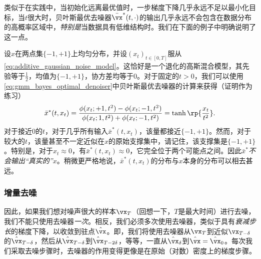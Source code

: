 \documentclass[../../book-main_zh.tex]{subfiles}
\begin{document}
类似于在实践中，当初始化远离最优值时，一步梯度下降几乎永远不足以最小化目标，当\(t\)很大时，贝叶斯最优去噪器\(\bar{\vx}^{\ast}(t, \cdot)\)的输出几乎永远不会包含在数据分布的高概率区域中，\textit{特别是}当数据具有低维结构时。我们在下面的例子中明确说明了这一点。
\begin{example}[两点混合的去噪]\label{example:denoising_twopoints}
    设\(x\)在两点集\(\{-1, +1\}\)上均匀分布，并设\((x_{t})_{t \in [0, T]}\)服从\eqref{eq:additive_gaussian_noise_model}。这恰好是一个退化的高斯混合模型，其先验等于\(\frac{1}{2}\)，均值为\(\{-1, +1\}\)，协方差均等于\(0\)。对于固定的\(t > 0\)，我们可以使用\eqref{eq:gmm_bayes_optimal_denoiser}中贝叶斯最优去噪器的计算来获得（证明作为练习）
    \begin{equation}
        \bar{x}^{\ast}(t, x_{t}) = \frac{\phi(x_{t} ; +1, t^{2}) - \phi(x_{t}
        ; -1, t^{2})}{\phi(x_{t} ; 1, t^{2}) + \phi(x_{t} ; -1,
        t^{2})} = \tanh\rp{\frac{x_{t}}{t^{2}}}.
    \end{equation}
    对于接近\(0\)的\(t\)，对于几乎所有输入\(\bar{x}^{\ast}(t, x_{t})\)，该量都接近\(\{-1, +1\}\)。然而，对于较大的\(t\)，该量甚至不一定近似在\(x\)的原始支撑集中，请记住，该支撑集是\(\{-1, +1\}\)。特别是，对于\(x_{t} \approx 0\)，有\(\bar{x}^{\ast}(t, x_{t}) \approx 0\)，它完全位于两个可能点之间。因此\(\bar{x}^{\ast}\)\textit{不会输出“真实的”\(x\)}。稍微更严格地说，\(\bar{x}^{\ast}(t, x_{t})\)的分布与\(x\)本身的分布可以相去甚远。
\end{example}

\subsubsection{增量去噪}
因此，如果我们想对噪声很大的样本\(\vx_{T}\)（回想一下，\(T\)是最大时间）进行去噪，我们不能只使用去噪器\textit{一次}。相反，我们必须多次使用去噪器，类似于具有\textit{衰减步长}的梯度下降，以收敛到驻点\(\hat{\vx}\)。即，我们将使用去噪器从\(\vx_{T}\)到近似\(\vx_{T - \delta}\)的\(\hat{\vx}_{T - \delta}\)，然后从\(\hat{\vx}_{T - \delta}\)到\(\hat{\vx}_{T - 2\delta}\)，等等，一直从\(\hat{\vx}_{\delta}\)到\(\hat{\vx} = \hat{\vx}_{0}\)。每次我们采取去噪步骤时，去噪器的作用变得更像是在原始（对数）密度上的梯度步骤。
\end{document}
